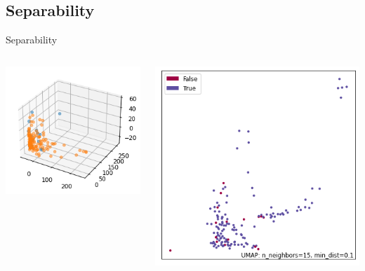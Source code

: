 \documentclass[hyperref={bookmarks=false}]{beamer}
\begin{document}
\subsection{Separability}
\begin{frame}{Separability}
\begin{columns}[c]
    \begin{center}
            \includegraphics[width=\textwidth]{../slike/pca.png}
        \end{center}
        \begin{center}
             \includegraphics[width=\textwidth]{../slike/umap.png} 
        \end{center}
\end{columns}
\end{frame}
\end{document}

